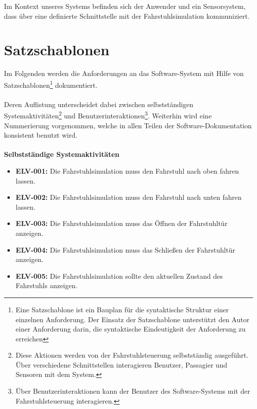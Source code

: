 \vspace{0,5cm}

Im Kontext unseres Systems befinden sich der Anwender und ein Sensorsystem, dass über eine definierte Schnittstelle mit der \gls{Fahrstuhlsimulation} kommuniziert.

\newpage
\section{Satzschablonen}
Im Folgenden werden die Anforderungen an das Software-System mit Hilfe von Satzschablonen\footnote{Eine Satzschablone ist ein Bauplan für die syntaktische Struktur einer einzelnen Anforderung. Der Einsatz der Satzschablone unterstützt den Autor einer Anforderung darin, die syntaktische Eindeutigkeit der Anforderung zu erreichen} dokumentiert.

\paragraph{}
Deren Auflistung unterscheidet dabei zwischen selbstständigen Systemaktivitäten\footnote{Diese Aktionen werden von der \gls{Fahrstuhlsteuerung} selbstständig ausgeführt. Über verschiedene Schnittstellen interagieren Benutzer, Passagier und Sensoren mit dem System.} und Benutzerinteraktionen\footnote{Über Benutzerinteraktionen kann der Benutzer des Software-Systems mit der \gls{Fahrstuhlsteuerung} interagieren.}. Weiterhin wird eine Nummerierung vorgenommen, welche in allen Teilen der Software-Dokumentation konsistent benutzt wird.

\paragraph{}
\textbf{Selbstständige Systemaktivitäten}
\begin{itemize}
	\item \textbf{ELV-001:} \newline
		Die \gls{Fahrstuhlsimulation} muss den Fahrstuhl nach oben fahren lassen.
	\item \textbf{ELV-002:} \newline
		Die \gls{Fahrstuhlsimulation} muss den Fahrstuhl nach unten fahren lassen.
	\item \textbf{ELV-003:} \newline
		Die \gls{Fahrstuhlsimulation} muss das Öffnen der Fahrstuhltür anzeigen.
	\item \textbf{ELV-004:} \newline
		Die \gls{Fahrstuhlsimulation} muss das Schließen der Fahrstuhltür anzeigen.
	\item \textbf{ELV-005:} \newline
		Die \gls{Fahrstuhlsimulation} sollte den aktuellen Zustand des Fahrstuhls anzeigen.
\end{itemize}

